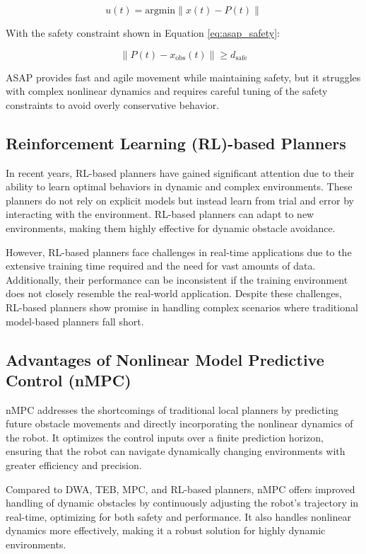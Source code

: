 \documentclass[conference]{IEEEtran}
\begin{document}
\begin{equation}
\label{eq:asap_control}
u(t) = \text{argmin} \| x(t) - P(t) \|
\end{equation}

With the safety constraint shown in Equation \eqref{eq:asap_safety}:

\begin{equation}
\label{eq:asap_safety}
\| P(t) - x_{\text{obs}}(t) \| \geq d_{\text{safe}}
\end{equation}

ASAP provides fast and agile movement while maintaining safety, but it struggles with complex nonlinear dynamics and requires careful tuning of the safety constraints to avoid overly conservative behavior.

\subsection{Reinforcement Learning (RL)-based Planners}
In recent years, RL-based planners have gained significant attention due to their ability to learn optimal behaviors in dynamic and complex environments. These planners do not rely on explicit models but instead learn from trial and error by interacting with the environment. RL-based planners can adapt to new environments, making them highly effective for dynamic obstacle avoidance.

However, RL-based planners face challenges in real-time applications due to the extensive training time required and the need for vast amounts of data. Additionally, their performance can be inconsistent if the training environment does not closely resemble the real-world application. Despite these challenges, RL-based planners show promise in handling complex scenarios where traditional model-based planners fall short.

\subsection{Advantages of Nonlinear Model Predictive Control (nMPC)}
nMPC addresses the shortcomings of traditional local planners by predicting future obstacle movements and directly incorporating the nonlinear dynamics of the robot. It optimizes the control inputs over a finite prediction horizon, ensuring that the robot can navigate dynamically changing environments with greater efficiency and precision.

Compared to DWA, TEB, MPC, and RL-based planners, nMPC offers improved handling of dynamic obstacles by continuously adjusting the robot's trajectory in real-time, optimizing for both safety and performance. It also handles nonlinear dynamics more effectively, making it a robust solution for highly dynamic environments.
\end{document}
